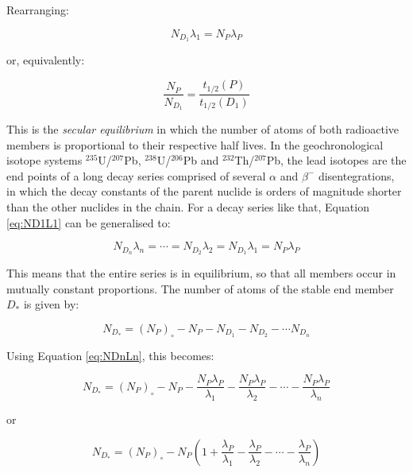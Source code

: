 \documentclass{book}
\begin{document}
Rearranging:

\begin{equation}
N_{D_1} \lambda_1 = N_P \lambda_P
\label{eq:ND1L1}
\end{equation}

or, equivalently:

\begin{equation}
\frac{N_P}{N_{D_1}} = \frac{t_{1/2}(P)}{t_{1/2}(D_1)}
\label{eq:NPND1}
\end{equation}

This is the \emph{secular equilibrium} in which the number of atoms of
both radioactive members is proportional to their respective half
lives. In the geochronological isotope systems $^{235}$U/$^{207}$Pb,
$^{238}$U/$^{206}$Pb and $^{232}$Th/$^{207}$Pb, the lead isotopes are
the end points of a long decay series comprised of several $\alpha$
and $\beta^-$ disentegrations, in which the decay constants of the
parent nuclide is orders of magnitude shorter than the other nuclides
in the chain. For a decay series like that, Equation \ref{eq:ND1L1}
can be generalised to:

\begin{equation}
N_{D_n} \lambda_n = \cdots  = N_{D_2} \lambda_2 = N_{D_1} \lambda_1 = N_{P} \lambda_P
\label{eq:NDnLn}
\end{equation}

This means that the entire series is in equilibrium, so that all
members occur in mutually constant proportions. The number of atoms of
the stable end member $D_*$ is given by:

\begin{equation}
N_{D_*} = (N_{P})_\circ - N_P - N_{D_1} - N_{D_2} - \cdots N_{D_n}
\label{eq:ND*}
\end{equation}

Using Equation \ref{eq:NDnLn}, this becomes:

\begin{equation}
N_{D_*} = (N_{P})_\circ - N_P - \frac{N_P \lambda_P}{\lambda_1} - 
\frac{N_P \lambda_P}{\lambda_2} - \cdots - \frac{N_P \lambda_P}{\lambda_n}
\label{eq:ND*2}
\end{equation}

or

\begin{equation}
N_{D_*} = (N_{P})_\circ - N_P \left( 1 + \frac{\lambda_P}{\lambda_1} - 
\frac{\lambda_P}{\lambda_2} - \cdots - \frac{\lambda_P}{\lambda_n}\right)
\label{eq:ND*3}
\end{equation}
\end{document}
